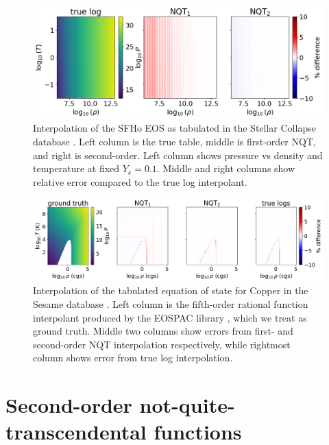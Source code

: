 \documentclass[linenumbers,twocolumn]{aastex631}
\begin{document}
\begin{nolinenumbers}
\begin{figure}[p!]
    \centering
    \includegraphics[width=0.75\linewidth]{figures/stellarcollapsecomp.png}
    \caption{Interpolation of the SFHo EOS \citep{SFHoEOS} as tabulated in the Stellar Collapse database \citep{stellarcollapsetables}. Left column is the true table, middle is first-order NQT, and right is second-order. Left column shows pressure vs density and temperature at fixed $Y_e=0.1.$ Middle and right columns show relative error compared to the true log interpolant.}
    \label{fig:SFHo}
\end{figure}
\end{nolinenumbers}

\begin{nolinenumbers}
\begin{figure}[p!]
    \centering
    \includegraphics[width=0.99\linewidth]{figures/sescomp.png}
    \caption{Interpolation of the tabulated equation of state for Copper in the Sesame database \citep{sesame,Peterson2012CopperEOS}. Left column is the fifth-order rational function interpolant produced by the EOSPAC library \citep{PimentelDavidA2021EUMV}, which we treat as ground truth. Middle two columns show errors from first- and second-order NQT interpolation respectively, while rightmost column shows error from true log interpolation.}
    \label{fig:copper}
\end{figure}
\end{nolinenumbers}

\section{Second-order not-quite-transcendental functions}
\label{sec:NQTo2}
\end{document}
